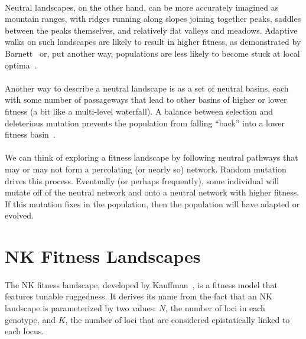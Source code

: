 \documentclass[12pt,letterpaper,titlepage,draft]{article}
\begin{document}
\paragraph{}
Neutral landscapes, on the other hand, can be more accurately imagined as
mountain ranges, with ridges running along slopes joining together peaks,
saddles between the peaks themselves, and relatively flat valleys and meadows.
Adaptive walks on such landscapes are likely to result in higher fitness, as
demonstrated by Barnett~\cite{Barnett1998} or, put another way, populations are
less likely to become stuck at local optima~\cite{Newman1998}.

\paragraph{}
Another way to describe a neutral landscape is as a set of neutral basins, each
with some number of passageways that lead to other basins of higher or lower
fitness (a bit like a multi-level waterfall). A balance between selection and
deleterious mutation prevents the population from falling ``back'' into a lower
fitness basin~\cite{Crutchfield1999}.

\paragraph{}
We can think of exploring a fitness landscape by following neutral pathways
that may or may not form a percolating (or nearly so) network. Random mutation
drives this process. Eventually (or perhaps frequently), some individual will
mutate off of the neutral network and onto a neutral network with higher
fitness. If this mutation fixes in the population, then the population will
have adapted or evolved.

\section{NK Fitness Landscapes}

\paragraph{}
The NK fitness landscape, developed by Kauffman~\cite{Kauffman1993}, is a
fitness model that features tunable ruggedness. It derives its name from the
fact that an NK landscape is parameterized by two values: $N$, the number of
loci in each genotype, and $K$, the number of loci that are considered
epistatically linked to each locus.
\end{document}
